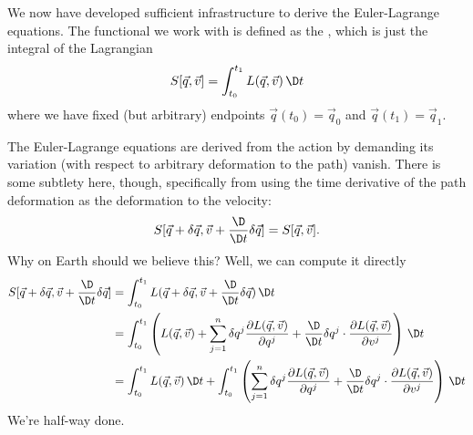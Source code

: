 We now have developed sufficient infrastructure to derive the
Euler-Lagrange equations. The functional we work with is defined as the
, which is just the integral of the Lagrangian
\begin{equation}
S[\vec{q},\vec{v}] = \int^{t_{1}}_{t_{0}}L(\vec{q},\vec{v})\,\D t
\end{equation}
where we have fixed (but arbitrary) endpoints
$\vec{q}(t_{0})=\vec{q}_{0}$ and $\vec{q}(t_{1})=\vec{q}_{1}$.

The Euler-Lagrange equations are derived from the action by demanding
its variation (with respect to arbitrary deformation to the path)
vanish. There is some subtlety here, though, specifically from using the
time derivative of the path deformation as the deformation to the
velocity:
\begin{equation}
S[\vec{q} + \delta\vec{q}, \vec{v} + \frac{\D}{\D t}\delta\vec{q}]
= S[\vec{q},\vec{v}].
\end{equation}
Why on Earth should we believe this? Well, we can compute it directly
\begin{subequations}
\begin{align}
S[\vec{q} + \delta\vec{q}, \vec{v} + \frac{\D}{\D t}\delta\vec{q}]
&=\int^{t_{1}}_{t_{0}} L(\vec{q} + \delta\vec{q}, \vec{v} + \frac{\D}{\D t}\delta\vec{q})\,\D t\\
&=\int^{t_{1}}_{t_{0}}\left(
L(\vec{q},\vec{v}) + \sum^{n}_{j=1}\delta q^{j}\frac{\partial L(\vec{q},\vec{v})}{\partial q^{j}}
+\frac{\D}{\D t}\delta q^{j}\cdot \frac{\partial L(\vec{q},\vec{v})}{\partial v^{j}}
\right)\,\D t\\
&=\int^{t_{1}}_{t_{0}}L(\vec{q},\vec{v})\,\D t +
\int^{t_{1}}_{t_{0}}\left(\sum^{n}_{j=1}\delta q^{j}\frac{\partial L(\vec{q},\vec{v})}{\partial q^{j}}
+\frac{\D}{\D t}\delta q^{j}\cdot \frac{\partial L(\vec{q},\vec{v})}{\partial v^{j}}
\right)\,\D t
\end{align}
\end{subequations}
We're half-way done.

